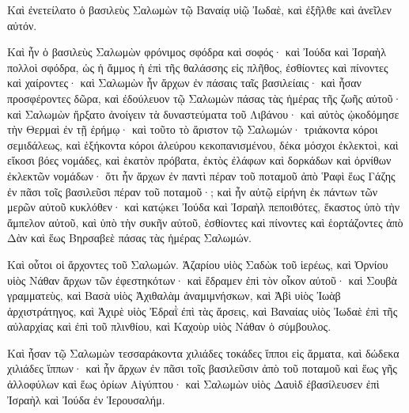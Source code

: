 {Καὶ ἐνετείλατο ὁ βασιλεὺς Σαλωμὼν τῷ Βαναίᾳ υἱῷ Ἰωδαὲ, καὶ ἐξῆλθε καὶ ἀνεῖλεν αὐτόν.
\par }{\PP {}Καὶ ἦν ὁ βασιλεὺς Σαλωμὼν φρόνιμος σφόδρα καὶ σοφός· καὶ Ἰούδα καὶ Ἰσραὴλ πολλοὶ σφόδρα, ὡς ἡ ἄμμος ἡ ἐπὶ τῆς θαλάσσης εἰς πλῆθος, ἐσθίοντες καὶ πίνοντες καὶ χαίροντες·
καὶ Σαλωμὼν ἦν ἄρχων ἐν πάσαις ταῖς βασιλείαις· καὶ ἦσαν προσφέροντες δῶρα, καὶ ἐδούλευον τῷ Σαλωμὼν πάσας τὰς ἡμέρας τῆς ζωῆς αὐτοῦ·
καὶ Σαλωμὼν ἤρξατο ἀνοίγειν τὰ δυναστεύματα τοῦ Λιβάνου·
καὶ αὐτὸς ᾠκοδόμησε τὴν Θερμαὶ ἐν τῇ ἐρήμῳ·
καὶ τοῦτο τὸ ἄριστον τῷ Σαλωμών· τριάκοντα κόροι σεμιδάλεως, καὶ ἑξήκοντα κόροι ἀλεύρου κεκοπανισμένου, δέκα μόσχοι ἐκλεκτοὶ, καὶ εἴκοσι βόες νομάδες, καὶ ἑκατὸν πρόβατα, ἐκτὸς ἐλάφων καὶ δορκάδων καὶ ὀρνίθων ἐκλεκτῶν νομάδων·
ὅτι ἦν ἄρχων ἐν παντὶ πέραν τοῦ ποταμοῦ ἀπὸ Ῥαφὶ ἕως Γάζης ἐν πᾶσι τοῖς βασιλεῦσι πέραν τοῦ ποταμοῦ·;
καὶ ἦν αὐτῷ εἰρήνη ἐκ πάντων τῶν μερῶν αὐτοῦ κυκλόθεν· καὶ κατῴκει Ἰούδα καὶ Ἰσραὴλ πεποιθότες, ἕκαστος ὑπὸ τὴν ἄμπελον αὐτοῦ, καὶ ὑπὸ τὴν συκῆν αὐτοῦ, ἐσθίοντες καὶ πίνοντες καὶ ἑορτάζοντες ἀπὸ Δὰν καὶ ἕως Βηρσαβεὲ πάσας τὰς ἡμέρας Σαλωμών.
\par }{\PP {}Καὶ οὗτοι οἱ ἄρχοντες τοῦ Σαλωμών. Ἀζαρίου υἱὸς Σαδὼκ τοῦ ἱερέως, καὶ Ὀρνίου υἱὸς Νάθαν ἄρχων τῶν ἐφεστηκότων· καὶ ἔδραμεν ἐπὶ τὸν οἶκον αὐτοῦ· καὶ Σουβὰ γραμματεὺς, καὶ Βασὰ υἱὸς Ἀχιθαλὰμ ἀναμιμνήσκων, καὶ Ἀβὶ υἱὸς Ἰωὰβ ἀρχιστράτηγος, καὶ Ἀχιρὲ υἱὸς Ἐδραῒ ἐπὶ τὰς ἄρσεις, καὶ Βαναίας υἱὸς Ἰωδαὲ ἐπὶ τῆς αὐλαρχίας καὶ ἐπὶ τοῦ πλινθίου, καὶ Καχοὺρ υἱὸς Νάθαν ὁ σύμβουλος.
\par }{\PP {}Καὶ ἦσαν τῷ Σαλωμὼν τεσσαράκοντα χιλιάδες τοκάδες ἵπποι εἰς ἅρματα, καὶ δώδεκα χιλιάδες ἵππων·
καὶ ἦν ἄρχων ἐν πᾶσι τοῖς βασιλεῦσιν ἀπὸ τοῦ ποταμοῦ καὶ ἕως γῆς ἀλλοφύλων καὶ ἕως ὁρίων Αἰγύπτου·
καὶ Σαλωμὼν υἱὸς Δαυὶδ ἐβασίλευσεν ἐπὶ Ἰσραὴλ καὶ Ἰούδα ἐν Ἱερουσαλήμ.

}
